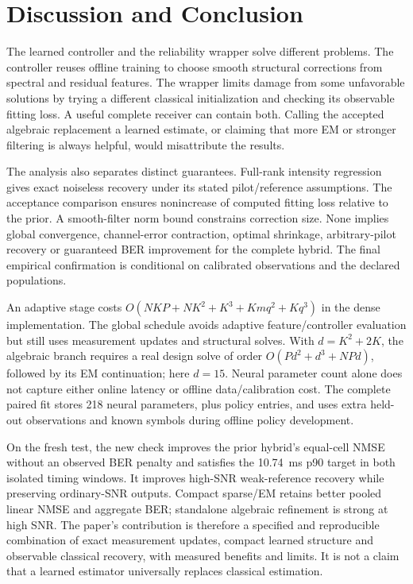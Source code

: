 \section{Discussion and Conclusion}
The learned controller and the reliability wrapper solve different problems. The controller reuses offline training to choose smooth structural corrections from spectral and residual features. The wrapper limits damage from some unfavorable solutions by trying a different classical initialization and checking its observable fitting loss. A useful complete receiver can contain both. Calling the accepted algebraic replacement a learned estimate, or claiming that more EM or stronger filtering is always helpful, would misattribute the results.

The analysis also separates distinct guarantees. Full-rank intensity regression gives exact noiseless recovery under its stated pilot/reference assumptions. The acceptance comparison ensures nonincrease of computed fitting loss relative to the prior. A smooth-filter norm bound constrains correction size. None implies global convergence, channel-error contraction, optimal shrinkage, arbitrary-pilot recovery or guaranteed BER improvement for the complete hybrid. The final empirical confirmation is conditional on calibrated observations and the declared populations.

An adaptive stage costs $O(NKP+NK^2+K^3+Kmq^2+Kq^3)$ in the dense implementation. The global schedule avoids adaptive feature/controller evaluation but still uses measurement updates and structural solves. With $d=K^2+2K$, the algebraic branch requires a real design solve of order $O(Pd^2+d^3+NPd)$, followed by its EM continuation; here $d=15$. Neural parameter count alone does not capture either online latency or offline data/calibration cost. The complete paired fit stores 218 neural parameters, plus policy entries, and uses extra held-out observations and known symbols during offline policy development.

On the fresh test, the new check improves the prior hybrid's equal-cell NMSE without an observed BER penalty and satisfies the 10.74~ms p90 target in both isolated timing windows. It improves high-SNR weak-reference recovery while preserving ordinary-SNR outputs. Compact sparse/EM retains better pooled linear NMSE and aggregate BER; standalone algebraic refinement is strong at high SNR. The paper's contribution is therefore a specified and reproducible combination of exact measurement updates, compact learned structure and observable classical recovery, with measured benefits and limits. It is not a claim that a learned estimator universally replaces classical estimation.

